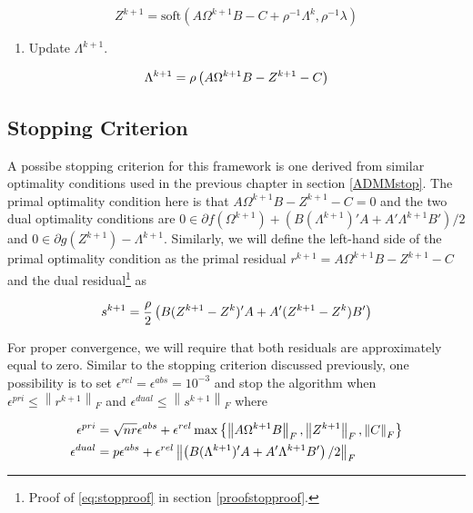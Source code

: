 \documentclass[11pt,]{report}
\providecommand{\tightlist}{%
  \setlength{\itemsep}{0pt}\setlength{\parskip}{0pt}}
\theoremstyle{definition}
\theoremstyle{definition}
\theoremstyle{definition}
\theoremstyle{remark}
\begin{document}
\begin{equation}
Z^{k + 1} = \mbox{soft}\left( A\Omega^{k + 1}B - C + \rho^{-1}\Lambda^{k}, \rho^{-1}\lambda \right)
\label{eq:Zk}
\end{equation}

\begin{enumerate}
\def\labelenumi{\arabic{enumi}.}
\setcounter{enumi}{4}
\tightlist
\item
  Update \(\Lambda^{k + 1}\).
\end{enumerate}

\begin{equation}
\Lambda^{k + 1} = \rho\left( A\Omega^{k + 1} B - Z^{k + 1} - C \right)
\label{eq:Yk}\notag
\end{equation}

\hypertarget{stopping-criterion}{%
\subsection{Stopping Criterion}\label{stopping-criterion}}

A possibe stopping criterion for this framework is one derived from similar optimality conditions used in the previous chapter in section \ref{ADMMstop}. The primal optimality condition here is that \(A\Omega^{k + 1}B - Z^{k + 1} - C = 0\) and the two dual optimality conditions are \(0 \in \partial f\left(\Omega^{k + 1}\right) + \left(B(\Lambda^{k + 1})'A + A'\Lambda^{k + 1}B' \right)/2\) and \(0 \in \partial g\left(Z^{k + 1}\right) - \Lambda^{k + 1}\). Similarly, we will define the left-hand side of the primal optimality condition as the primal residual \(r^{k + 1} = A\Omega^{k + 1}B - Z^{k + 1} - C\) and the dual residual\footnote{Proof of \eqref{eq:stopproof} in section \ref{proofstopproof}.} as

\begin{equation}
s^{k + 1} = \frac{\rho}{2}\left( B(Z^{k + 1} - Z^{k})'A + A'(Z^{k + 1} - Z^{k})B' \right)
\label{eq:stopproof}\notag
\end{equation}

For proper convergence, we will require that both residuals are approximately equal to zero. Similar to the stopping criterion discussed previously, one possibility is to set \(\epsilon^{rel} = \epsilon^{abs} = 10^{-3}\) and stop the algorithm when \(\epsilon^{pri} \leq \left\| r^{k + 1} \right\|_{F}\) and \(\epsilon^{dual} \leq \left\| s^{k + 1} \right\|_{F}\) where

\begin{equation}
\begin{split}
  \epsilon^{pri} &= \sqrt{nr}\epsilon^{abs} + \epsilon^{rel}\max\left\{ \left\| A\Omega^{k + 1}B \right\|_{F}, \left\| Z^{k + 1} \right\|_{F}, \left\| C \right\|_{F} \right\} \\
  \epsilon^{dual} &= p\epsilon^{abs} + \epsilon^{rel}\left\| \left( B(\Lambda^{k + 1})'A + A'\Lambda^{k + 1}B' \right)/2 \right\|_{F}
\end{split}
\label{eq:scpmestopping}\notag
\end{equation}
\end{document}
